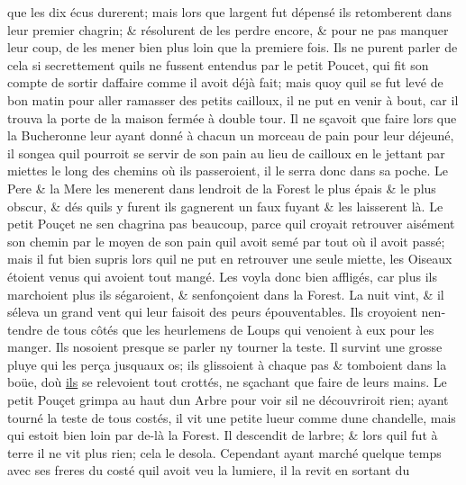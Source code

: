 \documentclass[14pt,a4paper]{memoir}
\newcommand{\ul}[1]{\uline{#1}}
\begin{document}
{{\begin{otherlanguage}{french}
que les dix écus durerent; mais lors que l\textquotesingle argent fut
dépensé ils retomberent dans leur premier chagrin; \& résolurent de les
perdre encore, \& pour ne pas manquer leur coup, de les mener bien plus
loin que la premiere fois. Ils ne purent parler de cela si secrettement
qu\textquotesingle ils ne fussent entendus par le petit Poucet, qui fit
son compte de sortir d\textquotesingle affaire comme il avoit déjà fait;
mais quoy qu\textquotesingle il se fut levé de bon matin pour aller
ramasser des petits cailloux, il ne put en venir à bout, car il trouva
la porte de la maison fermée à double tour. Il ne sçavoit que faire lors
que la Bucheronne leur ayant donné à chacun un morceau de pain pour leur
déjeuné, il songea qu\textquotesingle il pourroit se servir de son pain
au lieu de cailloux en le jettant par miettes le long des chemins où ils
passeroient, il le serra donc dans sa poche. Le Pere \& la Mere les
menerent dans l\textquotesingle endroit de la Forest le plus épais \& le
plus obscur, \& dés qu\textquotesingle ils y furent ils gagnerent un
faux fuyant \& les laisserent là. Le petit Pouçet ne
s\textquotesingle en chagrina pas beaucoup, parce qu\textquotesingle il
croyait retrouver aisément son chemin par le moyen de son pain
qu\textquotesingle il avoit semé par tout où il avoit passé; mais il fut
bien supris lors qu\textquotesingle il ne put en retrouver une seule
miette, les Oiseaux étoient venus qui avoient tout mangé. Les voyla donc
bien affligés, car plus ils marchoient plus ils
s\textquotesingle égaroient, \& s\textquotesingle enfonçoient dans la
Forest. La nuit vint, \& il s\textquotesingle éleva un grand vent qui
leur faisoit des peurs épouventables. Ils croyoient
n\textquotesingle entendre de tous côtés que les heurlemens de Loups qui
venoient à eux pour les manger. Ils n\textquotesingle osoient presque se
parler ny tourner la teste. Il survint une grosse pluye qui les perça
jusqu\textquotesingle aux os; ils glissoient à chaque pas \& tomboient
dans la boüe, d\textquotesingle où \ul{ils} se relevoient tout crottés,
ne sçachant que faire de leurs mains. Le petit Pouçet grimpa au haut
d\textquotesingle un Arbre pour voir s\textquotesingle il ne
découvriroit rien; ayant tourné la teste de tous costés, il vit une
petite lueur comme d\textquotesingle une chandelle, mais qui estoit bien
loin par de-là la Forest. Il descendit de l\textquotesingle arbre; \&
lors qu\textquotesingle il fut à terre il ne vit plus rien; cela le
desola. Cependant ayant marché quelque temps avec ses freres du costé
qu\textquotesingle il avoit veu la lumiere, il la revit en sortant du

\end{otherlanguage}}}
\end{document}
